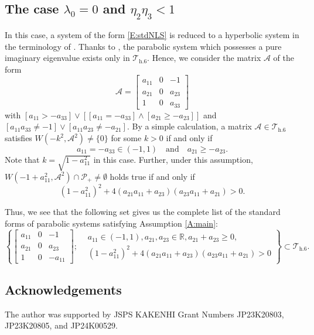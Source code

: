 \documentclass[11pt,a4paper,oneside]{amsart}
\theoremstyle{plain}
\theoremstyle{remark}
\numberwithin{equation}{section}
\newcommand{\R}{\mathbb{R}}
\def\ge{\geqslant}
\theoremstyle{definition}
\begin{document}
\subsection{The case $\lambda_0=0$ and $\eta_2\eta_3<1$}
In this case, a system of the form \eqref{E:stdNLS} is reduced to a hyperbolic system in the terminology of \cite{M}.
Thanks to \cite[Theorem 1.12]{M},
the parabolic system which possesses a pure imaginary eigenvalue exists only in $\mathcal{T}_{\mathrm{h}.6}$.
Hence, we consider the matrix $\mathscr{A}$  of the form
\begin{equation*}%
	\mathscr{A}=\begin{bmatrix}
	a_{11} & 0 & -1 \\
	a_{21} & 0 & a_{23} \\
	1 & 0 & a_{33}
	\end{bmatrix}
\end{equation*}
with
$[a_{11}>-a_{33}] \vee [[a_{11}=-a_{33}]\wedge [a_{21} \ge -a_{23}]]$
and $[a_{11}a_{33}\neq-1]\vee [a_{11}a_{23}\neq -a_{21}]$.
By a simple calculation,
a matrix $\mathscr{A} \in 	\mathcal{T}_{\mathrm{h}.6}$ satisfies $W(-k^2,\mathscr{A}^2) \neq \{0\}$ for some $k>0$ if and only if
\[
	a_{11}=-a_{33} \in (-1,1) \quad \text{and} \quad a_{21} \ge -a_{23}.
\]
Note that $k=\sqrt{1-a_{11}^2}$ in this case.
Further, under this assumption,
$W(-1+a_{11}^2, \mathscr{A}^2) \cap \mathcal{P}_+ \neq \emptyset $ holds true if and only if
\[
	(1-a_{11}^2)^2+ 4 (a_{21}a_{11}+a_{23})(a_{23}a_{11}+a_{21}) > 0.
\]

Thus, we see that the following set gives us the complete list of the standard forms of parabolic systems satisfying Assumption \ref{A:main}:
\[
	\left\{
\begin{bmatrix}
	a_{11} & 0 & -1 \\
	a_{21} & 0 & a_{23} \\
	1 & 0 & -a_{11}
	\end{bmatrix} ; 
	\begin{aligned}
	&a_{11} \in (-1,1),a_{21},a_{23} \in \R, a_{21}+ a_{23} \ge 0,\\
	&(1-a_{11}^2)^2+ 4 (a_{21}a_{11}+a_{23})(a_{23}a_{11}+a_{21}) > 0
	\end{aligned}
	\right\} \subset \mathcal{T}_{\mathrm{h}.6}.
\]



\subsection*{Acknowledgements} 
The author was supported by JSPS KAKENHI Grant Numbers JP23K20803, JP23K20805, and JP24K00529.
\end{document}
